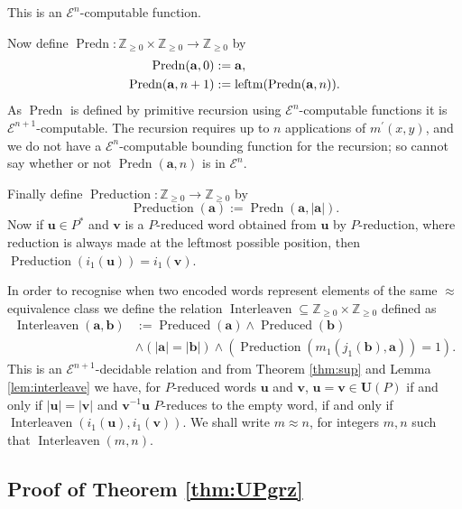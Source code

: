 \documentclass[a4paper]{article}
\newcommand{\grz}[1]{$\mathcal{E}^{#1}$}	%
\newcommand{\Zpos}{\mathbb{Z}_{\geq 0}}
\newcommand{\maps}{\longrightarrow}
\newcommand{\avec}{\mathbf{a}}	%
\newcommand{\bvec}{\mathbf{b}}	%
\newcommand{\uvec}{\mathbf{u}}	%
\newcommand{\vvec}{\mathbf{v}}	%
\newcommand{\Uvec}{\mathbf{U}}	%
\newcommand{\UP}{\Uvec(P)}
\newcommand{\Preduced}{\operatorname{Preduced}}
\newcommand{\leftm}{\operatorname{leftm}}
\newcommand{\Predn}{\operatorname{Predn}}
\newcommand{\Preduction}{\operatorname{Preduction}}
\newcommand{\Interleaven}{\operatorname{Interleaven}}
\theoremstyle{plain}
\theoremstyle{definition}
\begin{document}
This is an \grz{n}-computable function. 

Now define $\Predn:\Zpos\times \Zpos \maps \Zpos$ by
\begin{align}
\Predn(\avec,0) & := \avec,\notag\\
\Predn(\avec, n+1) & := \leftm(\Predn(\avec,n))\label{eq:Pr}.
\end{align} 
As $\Predn$ is defined by primitive recursion using \grz{n}-computable functions it
is \grz{n+1}-computable. 
The recursion requires up to $n$ applications of $m^\prime(x,y)$, and we 
do not have 
a \grz{n}-computable bounding function for the recursion; so cannot say
whether or not $\Predn(\avec,n)$ is in \grz{n}.

Finally define $\Preduction:\Zpos\maps \Zpos$ by
\begin{equation}\label{eq:Preduction}
\Preduction(\avec):=\Predn(\avec,|\avec|).
\end{equation}
Now if $\uvec \in P^\ast$ and $\vvec$ is a $P$-reduced word 
obtained from $\uvec$ by $P$-reduction, where reduction is always made 
at the leftmost possible position, then $\Preduction(i_1(\uvec))=i_1(\vvec)$. 

In order to recognise when two encoded words represent elements of the same
$\approx$ equivalence class we define the relation $\Interleaven\subseteq \Zpos\times \Zpos$ 
defined as 
\begin{equation}\label{eq:interleaven}
\begin{split}
\Interleaven(\avec,\bvec) & :=\Preduced(\avec)\wedge \Preduced(\bvec) \\ 
&\wedge (|\avec|=|\bvec|)
\wedge \left( \Preduction(m_1(j_1(\bvec),\avec))=1\right).
\end{split}
\end{equation}
This is an \grz{n+1}-decidable relation and from Theorem \ref{thm:sup} and Lemma \ref{lem:interleave} we have,
for $P$-reduced words $\uvec$ and $\vvec$, 
$\uvec=\vvec\in \UP$ if and only if  $|\uvec|=|\vvec|$ and $\vvec^{-1}\uvec$ $P$-reduces to the
empty word,  if and only if $\Interleaven(i_1(\uvec),i_1(\vvec))$.  
We shall write $m\approx n$, for integers $m,n$ such that $\Interleaven(m,n)$. 
\subsection{Proof of Theorem \ref{thm:UPgrz}}
\end{document}
